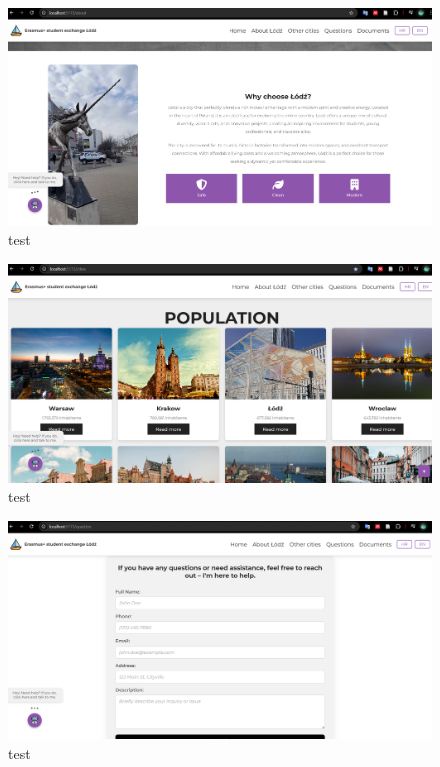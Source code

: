 \documentclass[]{foi}
\begin{document}
\begin{figure}[ht]
  \centering
  \includegraphics[width=1\textwidth]{./assets/about.png}
  \caption{test}
  \label{fig:slika95}
\end{figure}

\begin{figure}[ht]
  \centering
  \includegraphics[width=1\textwidth]{./assets/other.png}
  \caption{test}
  \label{fig:slika96}
\end{figure}

\begin{figure}[ht]
  \centering
  \includegraphics[width=1\textwidth]{./assets/question.png}
  \caption{test}
  \label{fig:slika97}
\end{figure}
\end{document}

